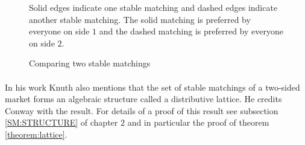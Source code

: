 \begin{figure}[h]
\centering
{}
\caption{Comparing two stable matchings}
\small
\begin{flushleft}
Solid edges indicate one stable matching and dashed edges indicate another stable matching. The solid matching is preferred by everyone on side $1$ and the dashed matching is preferred by everyone on side $2$.
\end{flushleft}
\end{figure}

\paragraph{}
In his work Knuth also mentions that the set of stable matchings of a two-sided market forms an algebraic structure called a distributive lattice. He credits Conway with the result. For details of a proof of this result see subsection \ref{SM:STRUCTURE} of chapter $2$ and in particular the proof of theorem \ref{theorem:lattice}.

